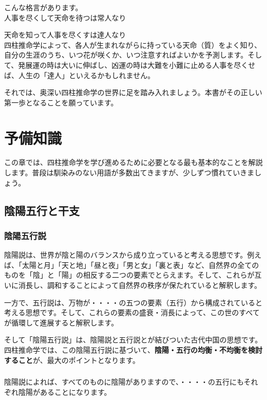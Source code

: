 \documentclass[a4paper,11pt,twocolumn,dvipdfmx]{tarticle}
\begin{document}
こんな格言があります。\\

人事を尽くして天命を待つは常人なり

天命を知って人事を尽くすは達人なり\\

四柱推命学によって、各人が生まれながらに持っている天命（質）をよく知り、自分の生涯のうち、いつ花が咲くか、いつ注意すればよいかを予測します。そして、発展運の時は大いに伸ばし、凶運の時は大難を小難に止める人事を尽くせば、人生の「達人」といえるかもしれません。

それでは、奥深い四柱推命学の世界に足を踏み入れましょう。本書がその正しい第一歩となることを願っています。

\newpage

\section{予備知識}

この章では、四柱推命学を学び進めるために必要となる最も基本的なことを解説します。普段は馴染みのない用語が多数出てきますが、少しずつ慣れていきましょう。

\subsection{陰陽五行と干支}
\subsubsection*{陰陽五行説}
陰陽説は、世界が陰と陽のバランスから成り立っていると考える思想です。例えば、「太陽と月」「天と地」「昼と夜」「男と女」「裏と表」など、自然界の全てのものを「陰」と「陽」の相反する二つの要素でとらえます。そして、これらが互いに消長し、調和することによって自然界の秩序が保たれていると解釈します。

一方で、五行説は、万物が・・・・の五つの要素（五行）から構成されていると考える思想です。そして、これらの要素の盛衰・消長によって、この世のすべてが循環して進展すると解釈します。

そして「陰陽五行説」は、陰陽説と五行説とが結びついた古代中国の思想です。四柱推命学では、この陰陽五行説に基づいて、\textbf{陰陽・五行の均衡・不均衡を検討すること}が、最大のポイントとなります。

\subsubsection*{}
陰陽説によれば、すべてのものに陰陽がありますので、・・・・の五行にもそれぞれ陰陽があることになります。
\end{document}
